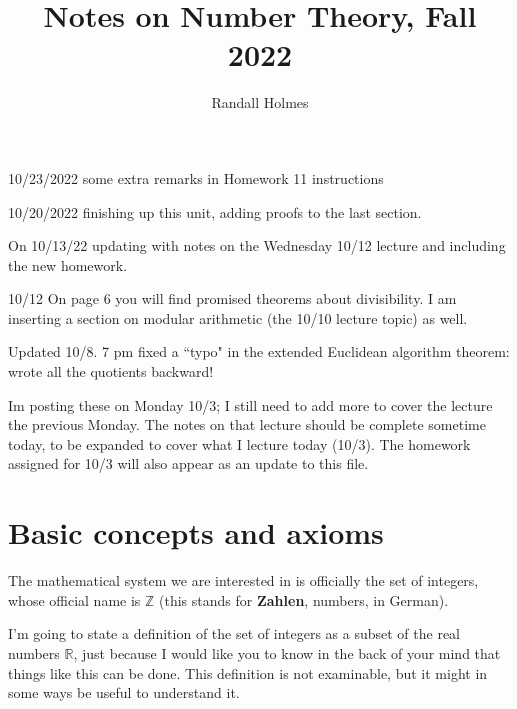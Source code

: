 \documentclass[12pt]{article}
\title{Notes on Number Theory, Fall 2022}
\author{Randall Holmes}
\begin{document}
\maketitle

10/23/2022 some extra remarks in Homework 11 instructions

10/20/2022 finishing up this unit, adding proofs to the last section.

On 10/13/22 updating with notes on the Wednesday 10/12 lecture and including the new homework.

10/12  On page 6 you will find promised theorems about divisibility.  I am inserting a section on modular arithmetic (the 10/10 lecture topic) as well.

Updated 10/8.  7 pm fixed a ``typo" in the extended Euclidean algorithm theorem:  wrote all the quotients backward!

Im posting these on Monday 10/3;  I still need to add more to cover the lecture the previous Monday.  The notes
on that lecture should be complete sometime today, to be expanded to cover what I lecture today (10/3).  The homework assigned for 10/3 will also appear as an update to this file.



\tableofcontents

\section{Basic concepts and axioms}

The mathematical system we are interested in is officially the set of integers, whose official name is $\mathbb Z$ (this stands for {\bf Zahlen}, numbers, in German).

I'm going to state a definition of the set of integers as a subset of the real numbers $\mathbb R$, just because I would like you to know in the back of your mind that things like this can be done.  This definition is not examinable, but it might in some ways be useful to understand it.
\end{document}
